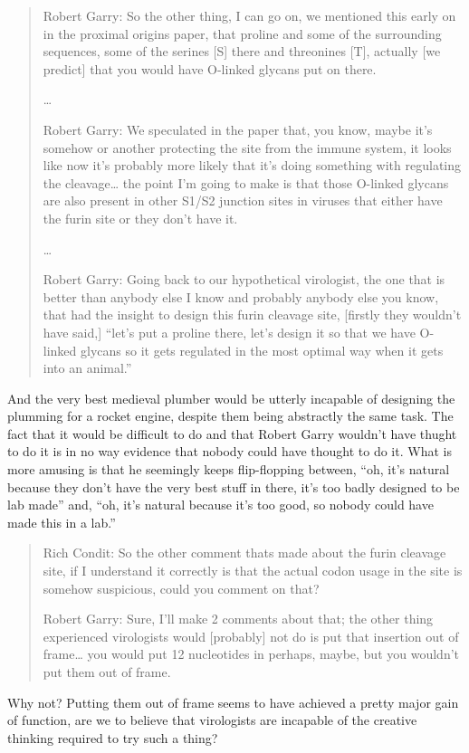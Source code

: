 \documentclass[11pt]{article}
\begin{document}
\begin{quote}
Robert Garry: So the other thing, I can go on, we mentioned this early on in the proximal origins paper, that proline and some of the surrounding sequences, some of the serines [S] there and threonines [T], actually [we predict] that you would have O-linked glycans put on there.

\ldots{}

Robert Garry: We speculated in the paper that, you know, maybe it's somehow or another protecting the site from the immune system, it looks like now it's probably more likely that it's doing something with regulating the cleavage\ldots{} the point I'm going to make is that those O-linked glycans are also present in other S1/S2 junction sites in viruses that either have the furin site or they don't have it.

\ldots{}

Robert Garry: Going back to our hypothetical virologist, the one that is better than anybody else I know and probably anybody else you know, that had the insight to design this furin cleavage site, [firstly they wouldn't have said,] ``let's put a proline there, let's design it so that we have O-linked glycans so it gets regulated in the most optimal way when it gets into an animal.''
\end{quote}
And the very best medieval plumber would be utterly incapable of designing the plumming for a rocket engine, despite them being abstractly the same task. The fact that it would be difficult to do and that Robert Garry wouldn't have thught to do it is in no way evidence that nobody could have thought to do it. What is more amusing is that he seemingly keeps flip-flopping between, ``oh, it's natural because they don't have the very best stuff in there, it's too badly designed to be lab made'' and, ``oh, it's natural because it's too good, so nobody could have made this in a lab.''

\begin{quote}
Rich Condit: So the other comment thats made about the furin cleavage site, if I understand it correctly is that the actual codon usage in the site is somehow suspicious, could you comment on that?

Robert Garry: Sure, I'll make 2 comments about that; the other thing experienced virologists would [probably] not do is put that insertion out of frame\ldots{} you would put 12 nucleotides in perhaps, maybe, but you wouldn't put them out of frame.
\end{quote}
Why not? Putting them out of frame seems to have achieved a pretty major gain of function, are we to believe that virologists are incapable of the creative thinking required to try such a thing?
\end{document}
